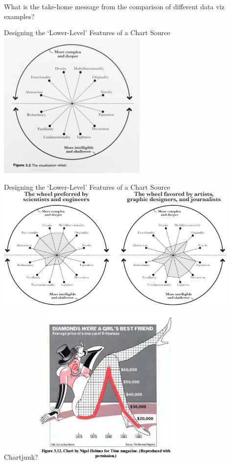 \documentclass[notes, aspectratio=1610]{beamer}
\begin{document}
\begin{frame}{}{}
	\centering
	\Large What is the take-home message from the comparison of different
	data viz examples?
\end{frame}

\begin{frame}{Designing the `Lower-Level' Features of a Chart}
	{Source \cite[][page 61]{cairo2012}}
	\centering 
	\includegraphics[width=0.55\textwidth]{images/viz_wheel.jpeg}
\end{frame}

\begin{frame}{Designing the `Lower-Level' Features of a Chart}
	{Source \cite[][page 63]{cairo2012}}
	\centering 
	\includegraphics[width=0.9\textwidth]{images/viz_whell_comparison.jpeg}
\end{frame}

\begin{frame}{Chartjunk?}{}
	\centering 
	\includegraphics[width=0.55\textwidth]{images/chartjunk.png}
\end{frame}
\end{document}
